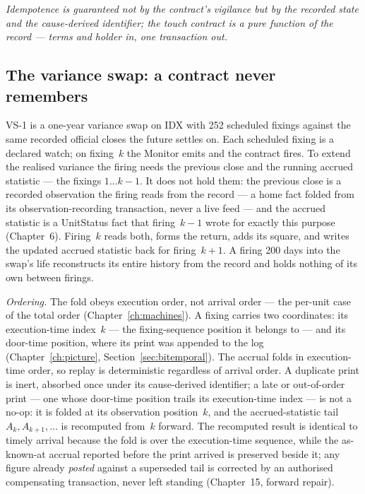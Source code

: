 \documentclass[11pt,a4paper]{article}
\begin{document}
\emph{Idempotence is guaranteed not by the contract's vigilance but by the
recorded state and the cause-derived identifier; the touch contract is a pure
function of the record --- terms and holder in, one transaction out.}

\subsection{The variance swap: a contract never remembers}

VS-1 is a one-year variance swap on IDX with 252 scheduled fixings against the
same recorded official closes the future settles on. Each scheduled fixing is a
declared watch; on fixing~$k$ the Monitor emits and the contract fires. To
extend the realised variance the firing needs the previous close and the running
accrued statistic --- the fixings $1 \ldots k-1$. It does not hold them: the
previous close is a recorded observation the firing reads from the record --- a
home fact folded from its observation-recording transaction, never a live feed ---
and the accrued statistic is a UnitStatus fact that firing~$k-1$ wrote for exactly
this purpose (Chapter~6).
Firing~$k$ reads both, forms the return, adds its square, and writes the updated
accrued statistic back for firing~$k+1$. A firing 200 days into the swap's life
reconstructs its entire history from the record and holds nothing of its own
between firings.

\emph{Ordering.} The fold obeys execution order, not arrival order --- the per-unit case of
the total order (Chapter~\ref{ch:machines}). A fixing carries
two coordinates: its execution-time index~$k$ --- the fixing-sequence position it
belongs to --- and its door-time position, where its print was appended to
the log (Chapter~\ref{ch:picture}, Section~\ref{sec:bitemporal}). The accrual folds
in execution-time order, so replay is deterministic regardless of arrival order. A
duplicate print is inert, absorbed once under its cause-derived identifier; a late
or out-of-order print --- one whose door-time position trails its execution-time
index --- is not a no-op: it is folded at its observation position~$k$, and the
accrued-statistic tail $A_k, A_{k+1}, \ldots$ is recomputed from~$k$ forward. The
recomputed result is identical to timely arrival because the fold is over the
execution-time sequence, while the as-known-at accrual reported before the print
arrived is preserved beside it; any figure already \emph{posted} against a superseded tail
is corrected by an authorised compensating transaction, never left standing
(Chapter~15, forward repair).
\end{document}
